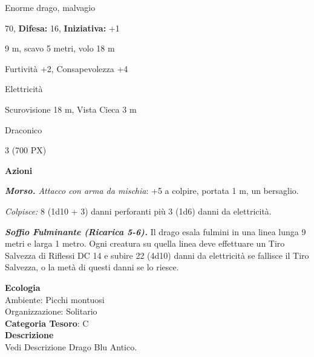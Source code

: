 \begin{multicols}{2}
{
\noindent
\begin{description}[noitemsep, topsep=0pt, parsep=0pt, partopsep=0pt, leftmargin=0cm, labelwidth=2.2cm]
	\item[\textbf{Taglia/Tipo:}] Enorme drago, malvagio
	\item[\textbf{Caratt.:}] 
	\item[\textbf{Punti Ferita:}] 70,  \textbf{Difesa:} 16,  \textbf{Iniziativa:} +1
	\item[\textbf{Movimento:}] 9 m, scavo 5 metri, volo 18 m
	\item[\textbf{Tiri Salvez.:}] 
	\item[\textbf{Comp.:}] Furtività +2, Consapevolezza +4
	\item[\textbf{Imm. Danni:}] Elettricità
	\item[\textbf{Sensi:}] Scurovisione 18 m, Vista Cieca 3 m
	\item[\textbf{Linguaggi:}] Draconico
	\item[\textbf{Sfida:}] 3 (700 PX)\smallskip
\end{description}

\textbf{Azioni}

\emph{\textbf{Morso.} Attacco con arma da mischia}: +5 a colpire, portata 1 m, un bersaglio.

\emph{Colpisce:} 8 (1d10 + 3) danni perforanti più 3 (1d6) danni da elettricità.

\emph{\textbf{Soffio Fulminante (Ricarica 5-6).}} Il drago esala fulmini in una linea lunga 9 metri e larga 1 metro. Ogni creatura su quella linea deve effettuare un Tiro Salvezza di Riflessi DC 14 e subire 22 (4d10) danni da elettricità se fallisce il Tiro Salvezza, o la metà di questi danni se lo riesce.

\textbf{Ecologia}\\
Ambiente: Picchi montuosi\\
Organizzazione: Solitario\\
\textbf{Categoria Tesoro}: C\\
\textbf{Descrizione}\\
Vedi Descrizione Drago Blu Antico.

}
\end{multicols}
